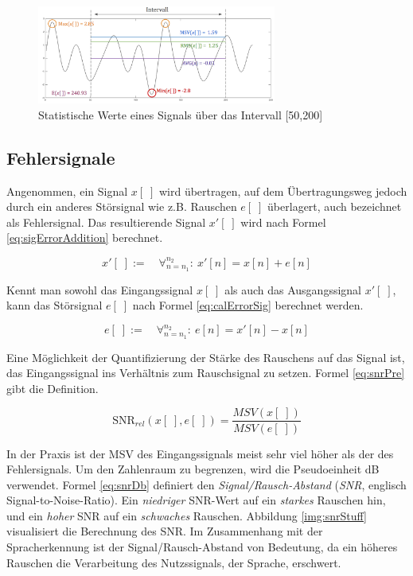 \begin{figure}[h]
	\centering
	\includegraphics[width=0.7\textwidth]{bilder/sigStats02.png}
	\caption{Statistische Werte eines Signals über das Intervall [50,200]}
	\label{img:sigStats}
\end{figure}

\subsection{Fehlersignale}

Angenommen, ein Signal $x[\;]$ wird übertragen, auf dem Übertragungsweg jedoch durch ein anderes Störsignal wie z.B. Rauschen $e[\;]$ überlagert, auch bezeichnet als Fehlersignal. Das resultierende Signal $x'[\;]$ wird nach Formel \ref{eq:sigErrorAddition} berechnet. 

\begin{equation}
x'[\;] := \quad \mathop{\forall}_{n = n_1}^{n_2} :\ x'[n] = x[n] + e[n]
\label{eq:sigErrorAddition}
\end{equation}

Kennt man sowohl das Eingangssignal $x[\;]$ als auch das Ausgangssignal $x'[\;]$, kann das Störsignal $e[\;]$ nach Formel \ref{eq:calErrorSig} berechnet werden.

\begin{equation}
e[\;] := \quad \mathop{\forall}_{n = n_1}^{n_2} :\ e[n] = x'[n] -x[n]
\label{eq:calErrorSig}
\end{equation}

Eine Möglichkeit der Quantifizierung der Stärke des Rauschens auf das Signal ist, das Eingangssignal ins Verhältnis zum Rauschsignal zu setzen. Formel \ref{eq:snrPre} gibt die Definition.


\begin{equation}
\text{SNR}_{rel}(x[\;],e[\;]) = \frac{MSV(x[\;])}{MSV(e[\;])}
\label{eq:snrPre}
\end{equation}

In der Praxis ist der MSV des Eingangssignals meist sehr viel höher als der des Fehlersignals. Um den Zahlenraum zu begrenzen, wird die Pseudoeinheit dB verwendet. Formel \ref{eq:snrDb} definiert den \emph{Signal/Rausch-Abstand} (\emph{SNR}, englisch Signal-to-Noise-Ratio). Ein \emph{niedriger} SNR-Wert auf ein \emph{starkes} Rauschen hin, und ein \emph{hoher} SNR auf ein \emph{schwaches} Rauschen. Abbildung \ref{img:snrStuff} visualisiert die Berechnung des SNR. Im Zusammenhang mit der Spracherkennung ist der Signal/Rausch-Abstand von Bedeutung, da ein höheres Rauschen die Verarbeitung des Nutzssignals, der Sprache, erschwert.

